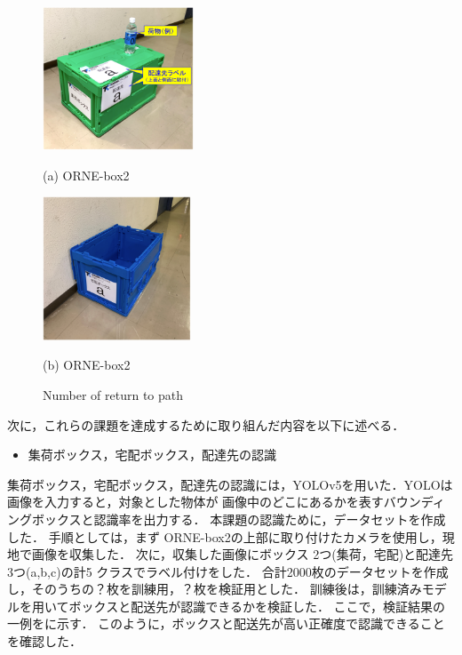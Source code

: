 \documentclass[twocolumn, 9pt]{jsproceedings}
\begin{document}
\begin{figure}[h!]
  \begin{minipage}[t]{0.47\linewidth}
    \centering
    \includegraphics[width=44.94mm]{fig/syuuka.pdf}
    \caption*{(a) ORNE-box2}
  \end{minipage}
  \hspace*{2mm}
  \begin{minipage}[t]{0.47\linewidth}
    \centering
    \includegraphics[width=44.21mm]{fig/takuhai.pdf}
    \caption*{(b) ORNE-box2}
  \end{minipage}%
  \caption{Number of return to path}
  \label{fig:hako}
\end{figure}

\vspace*{-2mm}次に，これらの課題を達成するために取り組んだ内容を以下に述べる．

\begin{itemize}
  \setlength{\leftskip}{-1zw}
  \item 集荷ボックス，宅配ボックス，配達先の認識
\end{itemize}
\vspace*{-2.5mm}

集荷ボックス，宅配ボックス，配達先の認識には，YOLOv5を用いた．YOLOは画像を入力すると，対象とした物体が
画像中のどこにあるかを表すバウンディングボックスと認識率を出力する．
本課題の認識ために，データセットを作成した．
手順としては，まず ORNE-box2の上部に取り付けたカメラを使用し，現地で画像を収集した．
次に，収集した画像にボックス 2つ(集荷，宅配)と配達先 3つ(a,b,c)の計5 クラスでラベル付けをした．
合計2000枚のデータセットを作成し，そのうちの？枚を訓練用，？枚を検証用とした．
訓練後は，訓練済みモデルを用いてボックスと配送先が認識できるかを検証した．
ここで，検証結果の一例をに示す．
このように，ボックスと配送先が高い正確度で認識できることを確認した．
\end{document}
